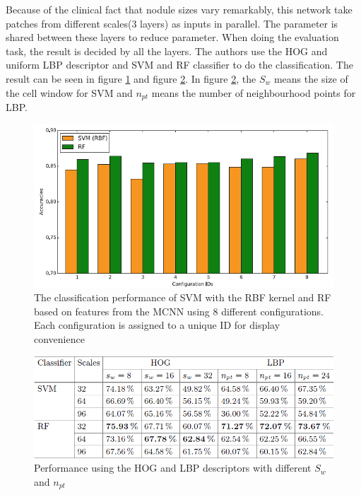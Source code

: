 \documentclass[10pt,twocolumn,letterpaper]{article}
\begin{document}
Because of the clinical fact that nodule sizes vary remarkably, this network take patches from different scales(3 layers) as inputs in parallel. The parameter is shared between these layers to reduce parameter. When doing the evaluation task, the result is decided by all the layers. The authors use the HOG and uniform LBP descriptor and SVM and RF classifier to do the classification. The result can be seen in figure \ref{fig:lohj,ng} and figure \ref{fig:lofhgtng}. In figure \ref{fig:lofhgtng}, the \textit{$S_w$} means the size of the cell window for SVM and \textit{$n_{pt}$} means the number of neighbourhood points for LBP.

\begin{figure}[t]
	\begin{center}
		\includegraphics[width=0.8\linewidth]{Pic/9.png}
	\end{center}
	\caption{The classification performance of SVM with the RBF kernel and RF based on features from the MCNN using 8 different configurations. Each configuration is assigned to a unique ID for display convenience}
	\label{fig:lohj,ng}

\end{figure}

\begin{figure}[t]
	\begin{center}
		\includegraphics[width=0.8\linewidth]{Pic/10.png}
	\end{center}
	\caption{Performance using the HOG and LBP descriptors with different \textit{$S_w$} and \textit{$n_{pt}$}}
	\label{fig:lofhgtng}

\end{figure}
\end{document}

